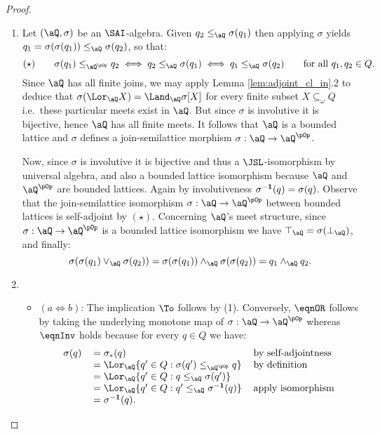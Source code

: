 \documentclass{article}
\begin{document}
\begin{proof}
\item
\begin{enumerate}
\item
Let $(\aQ,\sigma)$ be an $\SAI$-algebra. Given $q_2 \leq_\aQ \sigma(q_1)$ then applying $\sigma$ yields $q_1 = \sigma(\sigma(q_1)) \leq_\aQ \sigma(q_2)$, so that:
\[
(\star) \qquad
\sigma(q_1) \leq_{\aQ^{\pOp}} q_2
\iff
q_2 \leq_\aQ \sigma(q_1) \iff q_1 \leq_\aQ \sigma(q_2)
\qquad
\text{for all $q_1,q_2 \in Q$}.
\]
Since $\aQ$ has all finite joins, we may apply Lemma \ref{lem:adjoint_cl_in}.2 to deduce that $\sigma(\Lor_\aQ X) = \Land_\aQ \sigma[X]$ for every finite subset $X \subseteq_\omega Q$ i.e.\ these particular meets exist in $\aQ$. But since $\sigma$ is involutive it is bijective, hence $\aQ$ has all finite meets. It follows that $\aQ$ is a bounded lattice and $\sigma$ defines a join-semilattice morphism $\sigma : \aQ \to \aQ^{\pOp}$.

Now, since $\sigma$ is involutive it is bijective and thus a $\JSL$-isomorphism by universal algebra, and also a bounded lattice isomorphism because $\aQ$ and $\aQ^{\pOp}$ are bounded lattices. Again by involutiveness $\sigma^{\bf-1}(q) = \sigma(q)$. Observe that the join-semilattice isomorphism $\sigma : \aQ \to \aQ^{\pOp}$  between bounded lattices is self-adjoint by $(\star)$. Concerning $\aQ$'s meet structure, since $\sigma : \aQ \to \aQ^{\pOp}$ is a bounded lattice isomorphism we have $\top_\aQ = \sigma(\bot_\aQ)$, and finally:
\[
\sigma(\sigma(q_1) \lor_\aQ \sigma(q_2))
= \sigma(\sigma(q_1)) \land_\aQ \sigma(\sigma(q_2))
= q_1 \land_\aQ q_2.
\]


\item
\begin{itemize}
\item 
$(a \iff b)$: The implication $\To$ follows by (1). Conversely, $\eqnOR$ follows by taking the underlying monotone map of $\sigma : \aQ \to \aQ^{\pOp}$ whereas $\eqnInv$ holds because for every $q \in Q$ we have:
\[
\begin{tabular}{lll}
$\sigma(q)$
&
$= \sigma_*(q)$
& by self-adjointness
\\&
$= \Lor_\aQ \{ q' \in Q : \sigma(q') \leq_{\aQ^{\pOp}} q \}$
& by definition
\\&
$= \Lor_\aQ \{ q' \in Q : q \leq_\aQ \sigma(q') \}$
\\&
$= \Lor_\aQ \{ q' \in Q : q' \leq_\aQ \sigma^{\bf-1}(q) \}$
& apply isomorphism
\\&
$= \sigma^{\bf-1}(q)$.
\end{tabular}
\]


\end{itemize}
\end{enumerate}
\end{proof}
\end{document}
